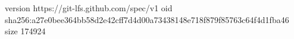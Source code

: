 version https://git-lfs.github.com/spec/v1
oid sha256:a27e0bee364bb58d2e42cff7d4d00a73438148e718f879f85763c64f4d1fba46
size 174924
